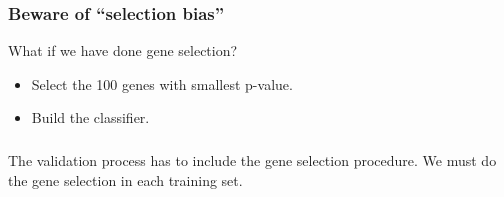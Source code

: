 


\begin{frame}
\frametitle{Beware of ``selection bias''}
What if we have done gene selection?

\begin{itemize}
\item Select the 100 genes with smallest p-value.
\item Build the classifier.
\end{itemize}
\end{frame}


\begin{frame}
\frametitle{}
The validation process has to include the gene selection procedure.
We must do the gene selection in each training set.
\end{frame}






